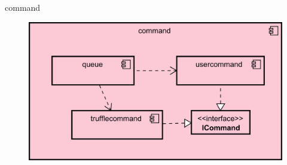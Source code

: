 \begin{frame}{command}
    \begin{figure}
    	\centering
    	\includegraphics[width=\textwidth]{./images/command.png}
    \end{figure}
\end{frame}
